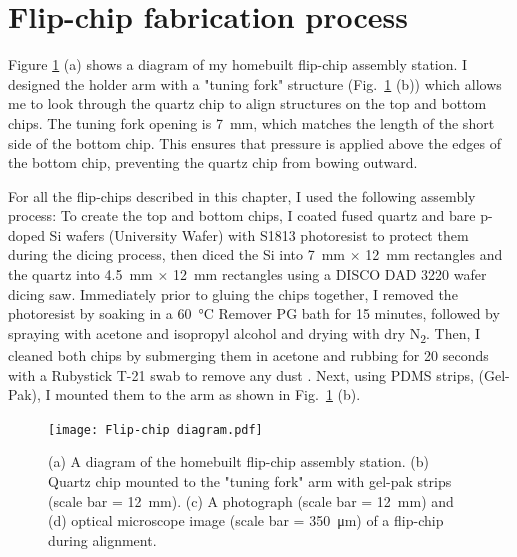 \documentclass{beavtex_dub_edit}
\begin{document}
\section{Flip-chip fabrication process} \label{FCfab}
Figure \ref{flip-chip diagram} (a) shows a diagram of my homebuilt flip-chip assembly station. I designed the holder arm with a "tuning fork" structure (Fig.\ \ref{flip-chip diagram} (b)) which allows me to look through the quartz chip to align structures on the top and bottom chips. The tuning fork opening is \SI{7}{\milli\meter}, which matches the length of the short side of the bottom chip. This ensures that pressure is applied above the edges of the bottom chip, preventing the quartz chip from bowing outward. 

For all the flip-chips described in this chapter, I used the following assembly process: To create the top and bottom chips, I coated fused quartz and bare p-doped Si wafers (University Wafer) with S1813 photoresist to protect them during the dicing process, then diced the Si into \SI{7}{\milli\meter} $\times$ \SI{12}{\milli\meter} rectangles and the quartz into \SI{4.5}{\milli\meter} $\times$ \SI{12}{\milli\meter} rectangles using a DISCO DAD 3220 wafer dicing saw. Immediately prior to gluing the chips together, I removed the photoresist by soaking in a \SI{60}{\celsius} Remover PG bath for 15 minutes, followed by spraying with acetone and isopropyl alcohol and drying with dry N\textsubscript{2}. Then, I cleaned both chips by submerging them in acetone and rubbing for 20 seconds with a Rubystick T-21 swab to remove any dust \cite{lane_integrating_2021}. Next, using PDMS strips, (Gel-Pak), I mounted them to the arm as shown in Fig.\ \ref{flip-chip diagram} (b). 

\begin{figure}
    \texttt{[image: Flip-chip diagram.pdf]}
    \caption{(a) A diagram of the homebuilt flip-chip assembly station. (b) Quartz chip mounted to the "tuning fork" arm with gel-pak strips (scale bar = \SI{12}{\milli\meter}). (c) A photograph (scale bar = \SI{12}{\milli\meter}) and (d) optical microscope image (scale bar = \SI{350}{\micro\meter}) of a flip-chip during alignment.}
    \label{flip-chip diagram}
\end{figure}
\end{document}
